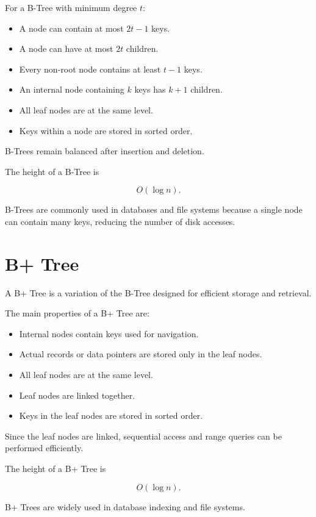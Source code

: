 \documentclass[12pt,a4paper]{article}
\begin{document}
For a B-Tree with minimum degree $t$:

\begin{itemize}
    \item A node can contain at most $2t-1$ keys.
    \item A node can have at most $2t$ children.
    \item Every non-root node contains at least $t-1$ keys.
    \item An internal node containing $k$ keys has $k+1$ children.
    \item All leaf nodes are at the same level.
    \item Keys within a node are stored in sorted order.
\end{itemize}

B-Trees remain balanced after insertion and deletion.

The height of a B-Tree is

\[
O(\log n).
\]

B-Trees are commonly used in databases and file systems because a single node can contain many keys, reducing the number of disk accesses.

\section{B+ Tree}

A B+ Tree is a variation of the B-Tree designed for efficient storage and retrieval.

The main properties of a B+ Tree are:

\begin{itemize}
    \item Internal nodes contain keys used for navigation.
    \item Actual records or data pointers are stored only in the leaf nodes.
    \item All leaf nodes are at the same level.
    \item Leaf nodes are linked together.
    \item Keys in the leaf nodes are stored in sorted order.
\end{itemize}

Since the leaf nodes are linked, sequential access and range queries can be performed efficiently.

The height of a B+ Tree is

\[
O(\log n).
\]

B+ Trees are widely used in database indexing and file systems.
\end{document}
